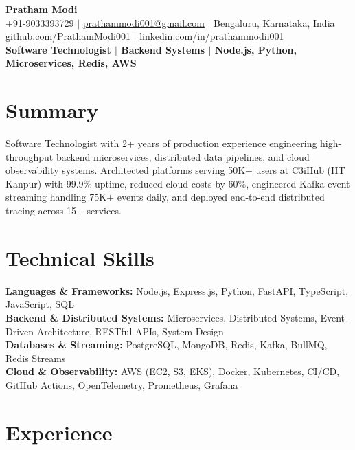 \documentclass[10pt]{article}
\begin{document}
\begin{center}
{\Huge \textbf{Pratham Modi}} \\[2pt]
+91-9033393729 $\vert$ \href{mailto:prathammodi001@gmail.com}{prathammodi001@gmail.com} $\vert$ Bengaluru, Karnataka, India \\[1pt]
\href{https://github.com/PrathamModi001}{github.com/PrathamModi001} $\vert$ \href{https://www.linkedin.com/in/prathammodii001/}{linkedin.com/in/prathammodii001} \\[2pt]
\textbf{Software Technologist $\vert$ Backend Systems $\vert$ Node.js, Python, Microservices, Redis, AWS}

\end{center}

\vspace{-6pt}
\section{Summary}
Software Technologist with 2+ years of production experience engineering high-throughput backend microservices, distributed data pipelines, and cloud observability systems. Architected platforms serving 50K+ users at C3iHub (IIT Kanpur) with 99.9\% uptime, reduced cloud costs by 60\%, engineered Kafka event streaming handling 75K+ events daily, and deployed end-to-end distributed tracing across 15+ services.

\section{Technical Skills}
\textbf{Languages \& Frameworks:} Node.js, Express.js, Python, FastAPI, TypeScript, JavaScript, SQL \\
\textbf{Backend \& Distributed Systems:} Microservices, Distributed Systems, Event-Driven Architecture, RESTful APIs, System Design \\
\textbf{Databases \& Streaming:} PostgreSQL, MongoDB, Redis, Kafka, BullMQ, Redis Streams \\
\textbf{Cloud \& Observability:} AWS (EC2, S3, EKS), Docker, Kubernetes, CI/CD, GitHub Actions, OpenTelemetry, Prometheus, Grafana \\

\section{Experience}
\end{document}
